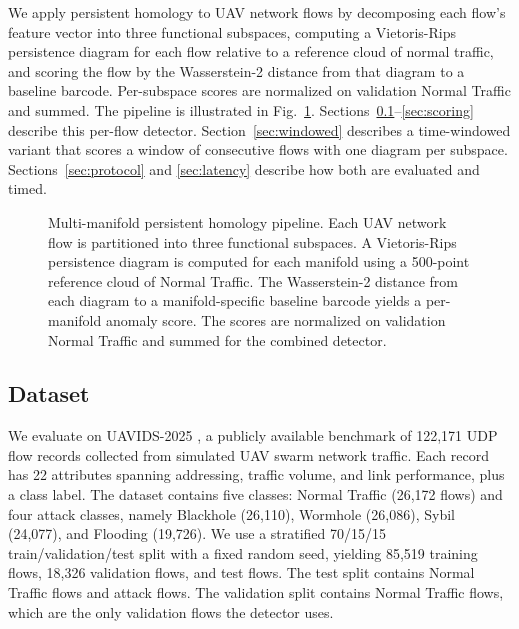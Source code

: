 \documentclass[conf]{new-aiaa}
\begin{document}
We apply persistent homology to UAV network flows by decomposing each flow's feature vector into three functional subspaces, computing a Vietoris-Rips persistence diagram for each flow relative to a reference cloud of normal traffic, and scoring the flow by the Wasserstein-2 distance from that diagram to a baseline barcode. Per-subspace scores are normalized on validation Normal Traffic and summed. The pipeline is illustrated in Fig.~\ref{fig:pipeline}. Sections~\ref{sec:dataset}--\ref{sec:scoring} describe this per-flow detector. Section~\ref{sec:windowed} describes a time-windowed variant that scores a window of consecutive flows with one diagram per subspace. Sections~\ref{sec:protocol} and \ref{sec:latency} describe how both are evaluated and timed.

\begin{figure}[h]
\centering
\resizebox{\columnwidth}{!}{}
\caption{Multi-manifold persistent homology pipeline. Each UAV network flow is partitioned into three functional subspaces. A Vietoris-Rips persistence diagram is computed for each manifold using a 500-point reference cloud of Normal Traffic. The Wasserstein-2 distance from each diagram to a manifold-specific baseline barcode yields a per-manifold anomaly score. The scores are normalized on validation Normal Traffic and summed for the combined detector.}
\label{fig:pipeline}
\end{figure}

\subsection{Dataset}
\label{sec:dataset}

We evaluate on UAVIDS-2025 \cite{Zeng}, a publicly available benchmark of 122,171 UDP flow records collected from simulated UAV swarm network traffic. Each record has 22 attributes spanning addressing, traffic volume, and link performance, plus a class label. The dataset contains five classes: Normal Traffic (26,172 flows) and four attack classes, namely Blackhole (26,110), Wormhole (26,086), Sybil (24,077), and Flooding (19,726). We use a stratified 70/15/15 train/validation/test split with a fixed random seed, yielding 85,519 training flows, 18,326 validation flows, and \NTestFlows{} test flows. The test split contains \NTestNormal{} Normal Traffic flows and \NTestAttack{} attack flows. The validation split contains \NValNormal{} Normal Traffic flows, which are the only validation flows the detector uses.
\end{document}
